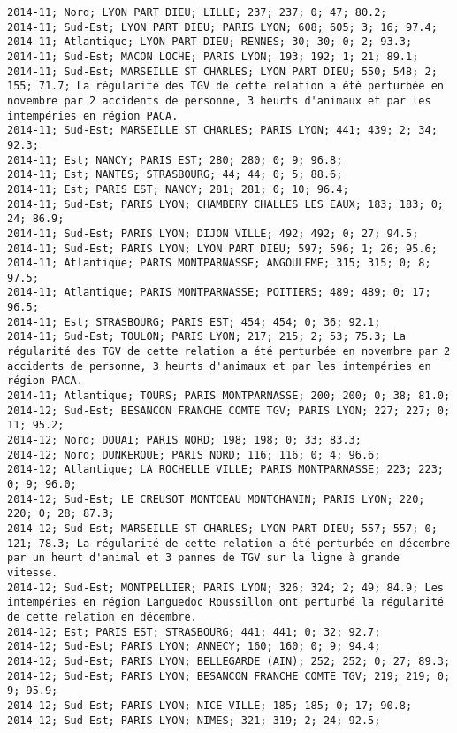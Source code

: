 \documentclass{article}
\begin{document}
\begin{Verbatim}[commandchars=\\\{\}]
2014-11; Nord; LYON PART DIEU; LILLE; 237; 237; 0; 47; 80.2; 
2014-11; Sud-Est; LYON PART DIEU; PARIS LYON; 608; 605; 3; 16; 97.4; 
2014-11; Atlantique; LYON PART DIEU; RENNES; 30; 30; 0; 2; 93.3; 
2014-11; Sud-Est; MACON LOCHE; PARIS LYON; 193; 192; 1; 21; 89.1; 
2014-11; Sud-Est; MARSEILLE ST CHARLES; LYON PART DIEU; 550; 548; 2; 155; 71.7; La régularité des TGV de cette relation a été perturbée en novembre par 2 accidents de personne, 3 heurts d'animaux et par les intempéries en région PACA.
2014-11; Sud-Est; MARSEILLE ST CHARLES; PARIS LYON; 441; 439; 2; 34; 92.3; 
2014-11; Est; NANCY; PARIS EST; 280; 280; 0; 9; 96.8; 
2014-11; Est; NANTES; STRASBOURG; 44; 44; 0; 5; 88.6; 
2014-11; Est; PARIS EST; NANCY; 281; 281; 0; 10; 96.4; 
2014-11; Sud-Est; PARIS LYON; CHAMBERY CHALLES LES EAUX; 183; 183; 0; 24; 86.9; 
2014-11; Sud-Est; PARIS LYON; DIJON VILLE; 492; 492; 0; 27; 94.5; 
2014-11; Sud-Est; PARIS LYON; LYON PART DIEU; 597; 596; 1; 26; 95.6; 
2014-11; Atlantique; PARIS MONTPARNASSE; ANGOULEME; 315; 315; 0; 8; 97.5; 
2014-11; Atlantique; PARIS MONTPARNASSE; POITIERS; 489; 489; 0; 17; 96.5; 
2014-11; Est; STRASBOURG; PARIS EST; 454; 454; 0; 36; 92.1; 
2014-11; Sud-Est; TOULON; PARIS LYON; 217; 215; 2; 53; 75.3; La régularité des TGV de cette relation a été perturbée en novembre par 2 accidents de personne, 3 heurts d'animaux et par les intempéries en région PACA.
2014-11; Atlantique; TOURS; PARIS MONTPARNASSE; 200; 200; 0; 38; 81.0; 
2014-12; Sud-Est; BESANCON FRANCHE COMTE TGV; PARIS LYON; 227; 227; 0; 11; 95.2; 
2014-12; Nord; DOUAI; PARIS NORD; 198; 198; 0; 33; 83.3; 
2014-12; Nord; DUNKERQUE; PARIS NORD; 116; 116; 0; 4; 96.6; 
2014-12; Atlantique; LA ROCHELLE VILLE; PARIS MONTPARNASSE; 223; 223; 0; 9; 96.0; 
2014-12; Sud-Est; LE CREUSOT MONTCEAU MONTCHANIN; PARIS LYON; 220; 220; 0; 28; 87.3; 
2014-12; Sud-Est; MARSEILLE ST CHARLES; LYON PART DIEU; 557; 557; 0; 121; 78.3; La régularité de cette relation a été perturbée en décembre par un heurt d'animal et 3 pannes de TGV sur la ligne à grande vitesse.
2014-12; Sud-Est; MONTPELLIER; PARIS LYON; 326; 324; 2; 49; 84.9; Les intempéries en région Languedoc Roussillon ont perturbé la régularité de cette relation en décembre.
2014-12; Est; PARIS EST; STRASBOURG; 441; 441; 0; 32; 92.7; 
2014-12; Sud-Est; PARIS LYON; ANNECY; 160; 160; 0; 9; 94.4; 
2014-12; Sud-Est; PARIS LYON; BELLEGARDE (AIN); 252; 252; 0; 27; 89.3; 
2014-12; Sud-Est; PARIS LYON; BESANCON FRANCHE COMTE TGV; 219; 219; 0; 9; 95.9; 
2014-12; Sud-Est; PARIS LYON; NICE VILLE; 185; 185; 0; 17; 90.8; 
2014-12; Sud-Est; PARIS LYON; NIMES; 321; 319; 2; 24; 92.5; 

\end{Verbatim}
\end{document}
